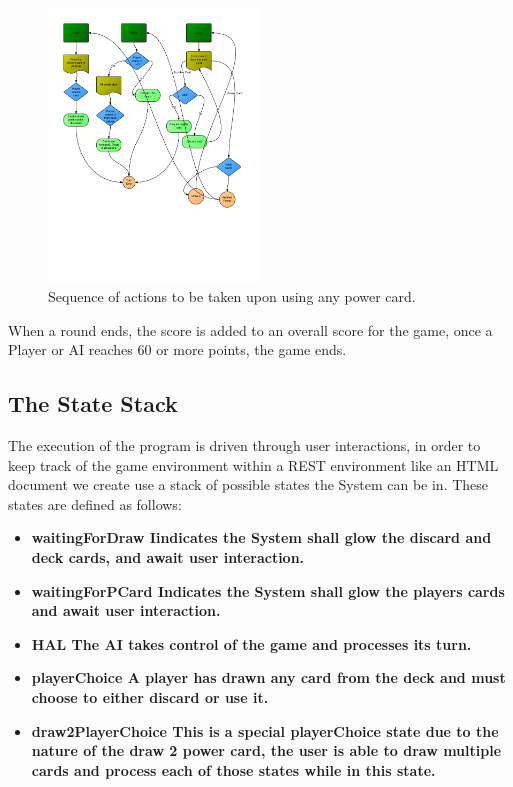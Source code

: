 \documentclass[12pt]{IEEEtran}
\begin{document}
	\begin{figure}[h]
		\centering
		\includegraphics[width=0.5\textwidth]{powercardactions.png}
		\caption{Sequence of actions to be taken upon using any power card.}
		\label{fig:powact}
	\end{figure}

	When a round ends, the score is added to an overall score for the game, once a Player or AI reaches 60 or more points, the game ends. 

\subsection{The State Stack }
\label{subsec:urlhandstack}

	The execution of the program is driven through user interactions, in order to keep track of the game environment within a REST environment like an HTML document we create use a stack of possible states the System can be in. These states are defined as follows:
	\begin{itemize}
		\item \bfseries waitingForDraw \mdseries Iindicates the System shall glow the discard and deck cards, and await user  interaction.
		\item \bfseries waitingForPCard \mdseries Indicates the System shall glow the players cards and await user interaction.
		\item \bfseries HAL \mdseries The AI takes control of the game and processes its turn. 
		\item \bfseries playerChoice \mdseries A player has drawn any card from the deck and must choose to either discard or use it.
		\item \bfseries draw2PlayerChoice  \mdseries This is a special playerChoice state due to the nature of the draw 2 power card, the user is able to draw multiple cards and process each of those states while in this state.
	\end{itemize}
\end{document}
